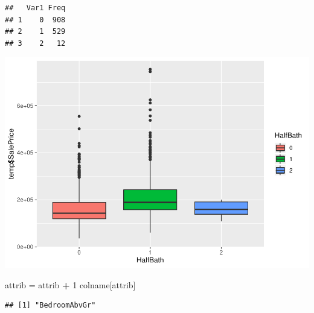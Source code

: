 \documentclass[]{article}
\newenvironment{Shaded}{\begin{snugshade}}{\end{snugshade}}
\newcommand{\DecValTok}[1]{\textcolor[rgb]{0.00,0.00,0.81}{#1}}
\newcommand{\StringTok}[1]{\textcolor[rgb]{0.31,0.60,0.02}{#1}}
\newcommand{\OperatorTok}[1]{\textcolor[rgb]{0.81,0.36,0.00}{\textbf{#1}}}
\newcommand{\NormalTok}[1]{#1}
\begin{document}
\begin{verbatim}
##   Var1 Freq
## 1    0  908
## 2    1  529
## 3    2   12
\end{verbatim}

\includegraphics{EDA_files/figure-latex/unnamed-chunk-73-1.pdf}

\begin{Shaded}
\begin{Highlighting}[]
\NormalTok{attrib =}\StringTok{ }\NormalTok{attrib }\OperatorTok{+}\StringTok{ }\DecValTok{1}
\NormalTok{colname[attrib]}
\end{Highlighting}
\end{Shaded}

\begin{verbatim}
## [1] "BedroomAbvGr"
\end{verbatim}
\end{document}
